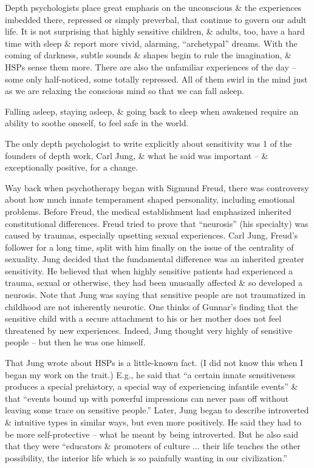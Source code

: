 \documentclass{article}
\numberwithin{equation}{section}
\begin{document}
Depth psychologists place great emphasis on the unconscious \& the experiences imbedded there, repressed or simply preverbal, that continue to govern our adult life. It is not surprising that highly sensitive children, \& adults, too, have a hard time with sleep \& report more vivid, alarming, ``archetypal'' dreams. With the coming of darkness, subtle sounds \& shapes begin to rule the imagination, \& HSPs sense them more. There are also the unfamiliar experiences of the day -- some only half-noticed, some totally repressed. All of them swirl in the mind just as we are relaxing the conscious mind so that we can fall asleep.

Falling asleep, staying asleep, \& going back to sleep when awakened require an ability to soothe oneself, to feel safe in the world.

The only depth psychologist to write explicitly about sensitivity was 1 of the founders of depth work, Carl Jung, \& what he said was important -- \& exceptionally positive, for a change.

Way back when psychotherapy began with Sigmund Freud, there was controversy about how much innate temperament shaped personality, including emotional problems. Before Freud, the medical establishment had emphasized inherited constitutional differences. Freud tried to prove that ``neurosis'' (his specialty) was caused by traumas, especially upsetting sexual experiences. Carl Jung, Freud's follower for a long time, split with him finally on the issue of the centrality of sexuality. Jung decided that the fundamental difference was an inherited greater sensitivity. He believed that when highly sensitive patients had experienced a trauma, sexual or otherwise, they had been unusually affected \& so developed a neurosis. Note that Jung was saying that sensitive people are not traumatized in childhood are not inherently neurotic. One thinks of Gunnar's finding that the sensitive child with a secure attachment to his or her mother does not feel threatened by new experiences. Indeed, Jung thought very highly of sensitive people -- but then he was one himself.

That Jung wrote about HSPs is a little-known fact. (I did not know this when I began my work on the trait.) E.g., he said that ``a certain innate sensitiveness produces a special prehistory, a special way of experiencing infantile events'' \& that ``events bound up with powerful impressions can never pass off without leaving some trace on sensitive people.'' Later, Jung began to describe introverted \& intuitive types in similar ways, but even more positively. He said they had to be more self-protective -- what he meant by being introverted. But he also said that they were ``educators \& promoters of culture $\ldots$ their life teaches the other possibility, the interior life which is so painfully wanting in our civilization.''
\end{document}
